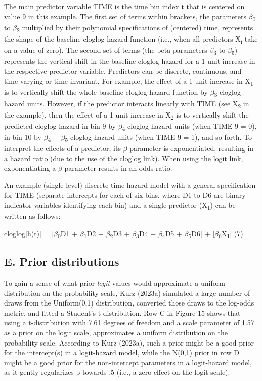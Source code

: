 \documentclass[
  man, donotrepeattitle,floatsintext]{apa6}
\begin{document}
The main predictor variable TIME is the time bin index t that is centered on value 9 in this example. The first set of terms within brackets, the parameters \(\beta\)\textsubscript{0} to \(\beta\)\textsubscript{2} multiplied by their polynomial specifications of (centered) time, represents the shape of the baseline cloglog-hazard function (i.e., when all predictors X\textsubscript{i} take on a value of zero). The second set of terms (the beta parameters \(\beta\)\textsubscript{3} to \(\beta\)\textsubscript{5}) represents the vertical shift in the baseline cloglog-hazard for a 1 unit increase in the respective predictor variable. Predictors can be discrete, continuous, and time-varying or time-invariant. For example, the effect of a 1 unit increase in X\textsubscript{1} is to vertically shift the whole baseline cloglog-hazard function by \(\beta\)\textsubscript{3} cloglog-hazard units. However, if the predictor interacts linearly with TIME (see X\textsubscript{2} in the example), then the effect of a 1 unit increase in X\textsubscript{2} is to vertically shift the predicted cloglog-hazard in bin 9 by \(\beta\)\textsubscript{4} cloglog-hazard units (when TIME-9 = 0), in bin 10 by \(\beta\)\textsubscript{4} + \(\beta\)\textsubscript{5} cloglog-hazard units (when TIME-9 = 1), and so forth. To interpret the effects of a predictor, its \(\beta\) parameter is exponentiated, resulting in a hazard ratio (due to the use of the cloglog link). When using the logit link, exponentiating a \(\beta\) parameter results in an odds ratio.

An example (single-level) discrete-time hazard model with a general specification for TIME (separate intercepts for each of six bins, where D1 to D6 are binary indicator variables identifying each bin) and a single predictor (X\textsubscript{1}) can be written as follows:

\noindent cloglog{[}h(t){]} = {[}\(\beta\)\textsubscript{0}D1 + \(\beta\)\textsubscript{1}D2 + \(\beta\)\textsubscript{2}D3 + \(\beta\)\textsubscript{3}D4 + \(\beta\)\textsubscript{4}D5 + \(\beta\)\textsubscript{5}D6{]} + {[}\(\beta\)\textsubscript{6}X\textsubscript{1}{]} \hfill  (7)

\subsection{E. Prior distributions}\label{e.-prior-distributions}

To gain a sense of what prior \emph{logit} values would approximate a uniform distribution on the probability scale, Kurz (2023a) simulated a large number of draws from the Uniform(0,1) distribution, converted those draws to the log-odds metric, and fitted a Student's t distribution. Row C in Figure 15 shows that using a t-distribution with 7.61 degrees of freedom and a scale parameter of 1.57 as a prior on the logit scale, approximates a uniform distribution on the probability scale. According to Kurz (2023a), such a prior might be a good prior for the intercept(s) in a logit-hazard model, while the N(0,1) prior in row D might be a good prior for the non-intercept parameters in a logit-hazard model, as it gently regularizes p towards .5 (i.e., a zero effect on the logit scale).
\end{document}
